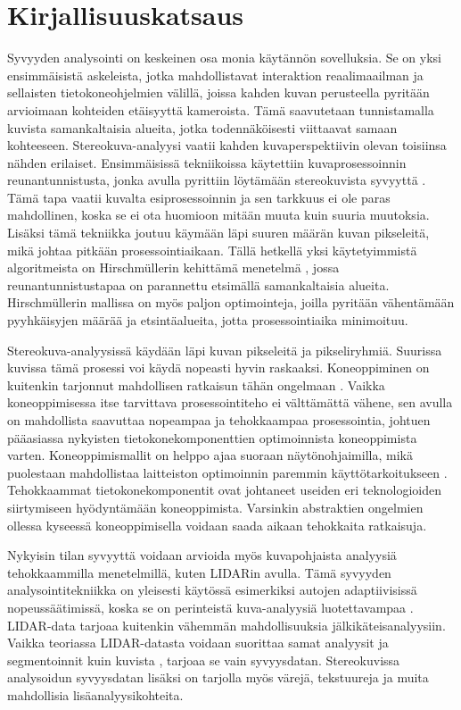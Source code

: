 \chapter{Kirjallisuuskatsaus}%
\label{ch:kirjallisuuskatsaus}

Syvyyden analysointi on keskeinen osa monia käytännön sovelluksia.  
Se on yksi ensimmäisistä askeleista, jotka mahdollistavat interaktion reaalimaailman ja sellaisten tietokoneohjelmien välillä,  
joissa kahden kuvan perusteella pyritään arvioimaan kohteiden etäisyyttä kameroista.  
Tämä saavutetaan tunnistamalla kuvista samankaltaisia alueita, jotka todennäköisesti viittaavat samaan kohteeseen.  
Stereokuva-analyysi vaatii kahden kuvaperspektiivin olevan toisiinsa nähden erilaiset.  
Ensimmäisissä tekniikoissa käytettiin kuvaprosessoinnin reunantunnistusta, jonka avulla pyrittiin löytämään stereokuvista syvyyttä \cite{BakerHenryHarlyn1982DfEa}.  
Tämä tapa vaatii kuvalta esiprosessoinnin ja sen tarkkuus ei ole paras mahdollinen, koska se ei ota huomioon mitään muuta kuin suuria muutoksia.
Lisäksi tämä tekniikka joutuu käymään läpi suuren määrän kuvan pikseleitä, mikä johtaa pitkään prosessointiaikaan. 
Tällä hetkellä yksi käytetyimmistä algoritmeista on Hirschmüllerin kehittämä menetelmä \cite{hirschmuller2005babel},  
jossa reunantunnistustapaa on parannettu etsimällä samankaltaisia alueita.  
Hirschmüllerin mallissa on myös paljon optimointeja, joilla pyritään vähentämään pyyhkäisyjen määrää ja etsintäalueita, jotta prosessointiaika minimoituu. 

Stereokuva-analyysissä käydään läpi kuvan pikseleitä ja pikseliryhmiä.  
Suurissa kuvissa tämä prosessi voi käydä nopeasti hyvin raskaaksi. 
Koneoppiminen on kuitenkin tarjonnut mahdollisen ratkaisun tähän ongelmaan \cite{LagaHamid2022ASoD}.  
Vaikka koneoppimisessa itse tarvittava prosessointiteho ei välttämättä vähene,
sen avulla on mahdollista saavuttaa nopeampaa ja tehokkaampaa prosessointia,
johtuen pääasiassa nykyisten tietokonekomponenttien optimoinnista koneoppimista varten.  
Koneoppimismallit on helppo ajaa suoraan näytönohjaimilla, mikä puolestaan mahdollistaa laitteiston optimoinnin paremmin käyttötarkoitukseen \cite{LeeVictorW2010Dt1G}.
Tehokkaammat tietokonekomponentit ovat johtaneet useiden eri teknologioiden siirtymiseen hyödyntämään koneoppimista.
Varsinkin abstraktien ongelmien ollessa kyseessä koneoppimisella voidaan saada aikaan tehokkaita ratkaisuja.


Nykyisin tilan syvyyttä voidaan arvioida myös kuvapohjaista analyysiä tehokkaammilla menetelmillä, kuten LIDARin avulla.
Tämä syvyyden analysointitekniikka on yleisesti käytössä esimerkiksi autojen adaptiivisissä nopeussäätimissä, koska se on perinteistä kuva-analyysiä luotettavampaa \cite{RorizRicardo2022ALTA}.
LIDAR-data tarjoaa kuitenkin vähemmän mahdollisuuksia jälkikäteisanalyysiin.  
Vaikka teoriassa LIDAR-datasta voidaan suorittaa samat analyysit ja segmentoinnit kuin kuvista \cite{SunJiaming2020DRS3}, tarjoaa se vain syvyysdatan.
Stereokuvissa analysoidun syvyysdatan lisäksi on tarjolla myös värejä, tekstuureja ja muita mahdollisia lisäanalyysikohteita.  

